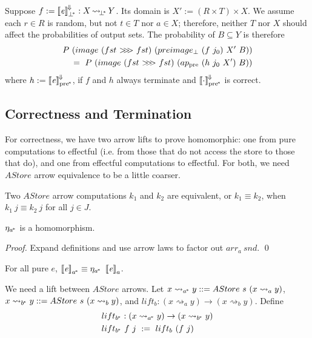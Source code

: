 \documentclass{llncs}
\newcommand{\arrow}{\rightsquigarrow}
\newcommand{\conv}{^{\mspace{-2mu}\Downarrow\mspace{-2mu}}}
\newcommand{\meaningofconv}[1]{\left\llbracket{#1}\right\rrbracket\conv}
\newcommand{\acomp}{\ensuremath{{>}\mspace{-6mu}{>}\mspace{-6mu}{>}}}
\newcommand{\gen}{_a}
\newcommand{\genb}{_b}
\newcommand{\genc}{_{a^{\mspace{-2mu}*}}}
\newcommand{\gend}{_{b^{\mspace{-2mu}*}}}
\newcommand{\pbot}{{\bot^{\mspace{-4mu}*}}}
\newcommand{\pre}{_\mathrm{pre}}
\newcommand{\ppre}{_\mathrm{pre^{\mspace{-2mu}*}}}
\DeclareMathOperator{\pbotto}{{\arrow\mspace{-3mu}}_\pbot}
\begin{document}
Suppose $f := \meaningofconv{\mathit{e}}_\pbot : X \pbotto Y$.
Its domain is $X' := (R \times T) \times X$.
We assume each $r \in R$ is random, but not $t \in T$ nor $a \in X$; therefore, neither $T$ nor $X$ should affect the probabilities of output sets.
The probability of $B \subseteq Y$ is therefore
\begin{equation}
\begin{aligned}
	&P~(image~(fst~\acomp~fst)~(preimage_\bot~(f~j_0)~X'~B)) \\
	&\tab =\ P~(image~(fst~\acomp~fst)~(ap\pre~(h~j_0~X')~B))
\end{aligned}
\end{equation}
where $h := \meaningofconv{\mathit{e}}\ppre$, if $f$ and $h$ always terminate and $\meaningofconv{\cdot}\ppre$ is correct.

\subsection{Correctness and Termination}

For correctness, we have two arrow lifts to prove homomorphic: one from pure computations to effectful (i.e. from those that do not access the store to those that do), and one from effectful computations to effectful.
For both, we need $AStore$ arrow equivalence to be a little coarser.

\begin{definition}
Two $AStore$ arrow computations $k_1$ and $k_2$ are equivalent, or $k_1 \equiv k_2$, when $k_1~j \equiv k_2~j$ for all $j \in J$.
\end{definition}

\begin{theorem}
$\eta\genc$ is a homomorphism.
\end{theorem}
\begin{proof}
Expand definitions and use arrow laws to factor out $arr\gen~snd$.
\qed
\end{proof}

\begin{corollary}
\label{cor:pure-astore-semantic-correctness}
For all pure $\mathit{e}$, $\meaningof{\mathit{e}}\genc \equiv \eta\genc~\meaningof{\mathit{e}}\gen$.
\end{corollary}

We need a lift between $AStore$ arrows.
Let $x \arrow\genc y ::= AStore~s~(x \arrow\gen y)$, $x \arrow\gend y ::= AStore~s~(x \arrow\genb y)$, and $lift\genb : (x \arrow\gen y) \to (x \arrow\genb y)$.
Define
\begin{equation}
\begin{aligned}
	&lift\gend : (x \arrow\genc y) \to (x \arrow\gend y) \\
	&lift\gend~f~j \ := \ lift\genb~(f~j)
\end{aligned}
\end{equation}
\end{document}

